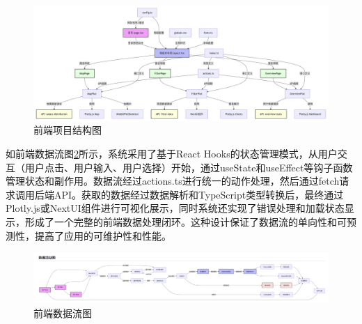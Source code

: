 \begin{figure}[htbp]
    \centering
    \includegraphics[width=1.0\textwidth]{figures/前端项目结构图.png}
    \caption{前端项目结构图}
    \label{fig:front_end_structure}
\end{figure}

如前端数据流图\ref{fig:front_end_data_flow}所示，系统采用了基于React Hooks的状态管理模式，从用户交互（用户点击、用户输入、用户选择）开始，通过useState和useEffect等钩子函数管理状态和副作用。数据流经过actions.ts进行统一的动作处理，然后通过fetch请求调用后端API。获取的数据经过数据解析和TypeScript类型转换后，最终通过Plotly.js或NextUI组件进行可视化展示，同时系统还实现了错误处理和加载状态显示，形成了一个完整的前端数据处理闭环。这种设计保证了数据流的单向性和可预测性，提高了应用的可维护性和性能。


\begin{figure}[htbp]
    \centering
    \includegraphics[width=1.0\textwidth]{figures/前端数据流图.png}
    \caption{前端数据流图}
    \label{fig:front_end_data_flow}
\end{figure}

